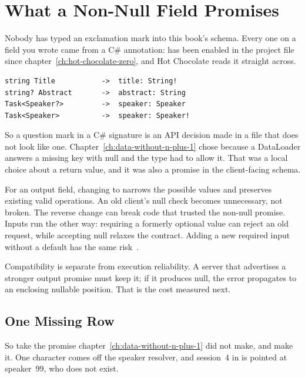 \section{What a Non-Null Field Promises}
\label{sec:ch04-what-a-non-null-field-promises}

%
Nobody has typed an exclamation mark into this book's schema. Every one on a
field you wrote came from a C\# annotation:  has been enabled in
the project file since chapter~\ref{ch:hot-chocolate-zero}, and Hot Chocolate
reads it straight across.

\begin{verbatim}
string Title           ->  title: String!
string? Abstract       ->  abstract: String
Task<Speaker?>         ->  speaker: Speaker
Task<Speaker>          ->  speaker: Speaker!
\end{verbatim}

%
So a question mark in a C\# signature is an API decision made in a file that
does not look like one. Chapter~\ref{ch:data-without-n-plus-1} chose
 because a DataLoader answers a missing key with null and
the type had to allow it. That was a local choice about a return value, and it
was also a promise in the client-facing schema.

%
For an output field, changing  to  narrows the
possible values and preserves existing valid operations. An old client's null
check becomes unnecessary, not broken. The reverse change can break code that
trusted the non-null promise. Inputs run the other way: requiring a formerly
optional value can reject an old request, while accepting null relaxes the
contract. Adding a new required input without a default has the same
risk~\autocite{apollocompatrepair}.

Compatibility is separate from execution reliability. A server that advertises
a stronger output promise must keep it; if it produces null, the error
propagates to an enclosing nullable position. That is the cost measured next.

\subsection{One Missing Row}

%
So take the promise chapter~\ref{ch:data-without-n-plus-1} did not make, and
make it. One character comes off the speaker resolver, and session~4 in
 is pointed at speaker~99, who does not exist.

